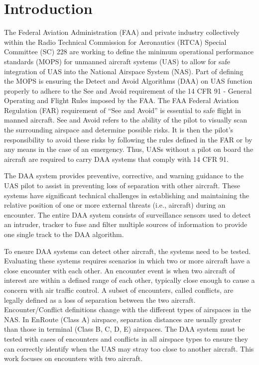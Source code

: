 
\chapter{Introduction}

The Federal Aviation Administration (FAA) and private industry collectively within the Radio Technical Commission for Aeronautics (RTCA) Special Committee (SC) 228 are working to define the minimum operational performance standards (MOPS) for unmanned aircraft systems (UAS) to allow for safe integration of UAS into the National Airspace System (NAS). Part of defining the MOPS is ensuring the Detect and Avoid Algorithms (DAA) on UAS function properly to adhere to the See and Avoid requirement of the 14 CFR 91 - General Operating and Flight Rules imposed by the FAA. The FAA Federal Aviation Regulation (FAR) requirement of “See and Avoid” is essential to safe flight in manned aircraft. See and Avoid refers to the ability of the pilot to visually scan the surrounding airspace and determine possible risks. It is then the pilot's responsibility to avoid these risks by following the rules defined in the FAR or by any means in the case of an emergency. Thus, UASs without a pilot on board the aircraft are required to carry DAA systems that comply with 14 CFR 91.

The DAA system provides preventive, corrective, and warning guidance to the UAS pilot to assist in preventing loss of separation with other aircraft. These systems have significant technical challenges in establishing and maintaining the relative position of one or more external threats (i.e., aircraft) during an encounter. The entire DAA system consists of surveillance sensors used to detect an intruder, tracker to fuse and filter multiple sources of information to provide one single track to the DAA algorithm.

To ensure DAA systems can detect other aircraft, the systems need to be tested. Evaluating these systems requires scenarios in which two or more aircraft have a close encounter with each other. An encounter event is when two aircraft of interest are within a defined range of each other, typically close enough to cause a concern with air traffic control. A subset of encounters, called conflicts, are legally defined as a loss of separation between the two aircraft. Encounter/Conflict definitions change with the different types of airspaces in the NAS. In EnRoute (Class A) airspace, separation distances are usually greater than those in terminal (Class B, C, D, E) airspaces. The DAA system must be tested with cases of encounters and conflicts in all airspace types to ensure they can correctly identify when the UAS may stray too close to another aircraft. This work focuses on encounters with two aircraft.

